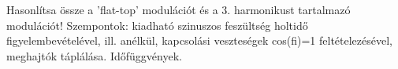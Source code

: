\begin{example}

Hasonlítsa össze a ’flat-top’ modulációt és a 3. harmonikust tartalmazó modulációt! Szempontok: kiadható szinuszos feszültség holtidő figyelembevételével, ill. anélkül,  kapcsolási veszteségek cos(fi)=1 feltételezésével, meghajtók táplálása. Időfüggvények.

\tcbline
\vspace{1mm}

\solution

\end{example}